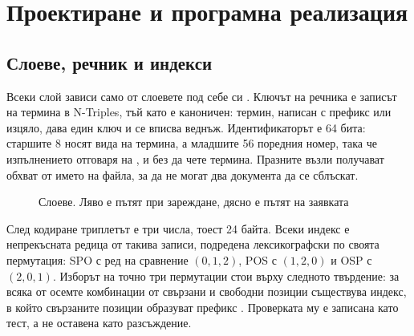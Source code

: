 \section{Проектиране и програмна реализация}
\label{sec:design}
\label{sec:implementation}

\subsection{Слоеве, речник и индекси}

Всеки слой зависи само от слоевете под себе си . Ключът на речника е
записът на термина в N-Triples, тъй като е каноничен: термин, написан с префикс или изцяло,
дава един ключ и се вписва веднъж. Идентификаторът е 64 бита: старшите 8 носят вида на термина,
а младшите 56 поредния номер, така че изпълнението отговаря на ,  и
 без да чете термина. Празните възли получават обхват от името на файла, за да не
могат два документа да се сблъскат.

\begin{figure}[H]
\centering
{}
\caption{Слоеве. Ляво е пътят при зареждане, дясно е пътят на заявката}
\label{fig:architecture}
\end{figure}

След кодиране триплетът е три числа, тоест 24 байта. Всеки индекс е непрекъсната редица от
такива записи, подредена лексикографски по своята пермутация: SPO с ред на сравнение $(0,1,2)$,
POS с $(1,2,0)$ и OSP с $(2,0,1)$. Изборът на точно три пермутации стои върху следното
твърдение: за всяка от осемте комбинации от свързани и свободни позиции съществува индекс, в
който свързаните позиции образуват префикс . Проверката му е записана
като тест, а не оставена като разсъждение.

